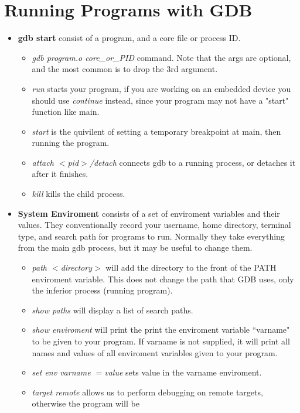 \documentclass{article}
\begin{document}
\section*{Running Programs with GDB}
	\begin{itemize}
		\item \textbf{gdb start} consist of a program, and a core file or process ID. 
			\begin{itemize}
				\item \textit{gdb program.o core\_or\_PID} command. Note that the args are optional, and the 
					most common is to drop the 3rd argument.
				\item \textit{run} starts your program, if you are working on an embedded device you should 
					use \textit{continue} instead, since your program may not have a "start" function like main.
				\item \textit{start} is the quivilent of setting a temporary breakpoint at main, then running the program.
				\item \textit{attach $<$pid$>$/detach} connects gdb to a running process, or detaches it after it finishes.
				\item \textit{kill} kills the child process.
			\end{itemize}
		\item \textbf{System Enviroment} consists of a set of enviroment variables and their values. They 
			conventionally record your username, home directory, terminal type, and search path for programs to 
			run. Normally they take everything from the main gdb process, but it may be useful to change them.
			\begin{itemize}
				\item \textit{path $<$directory$>$} will add the directory to the front of the PATH enviroment variable. 
					This does not change the path that GDB uses, only the inferior process (running program).
				\item \textit{show paths} will display a list of search paths.
				\item \textit{show enviroment} will print the print the enviroment variable ``varname" to be given to 
					your program. If varname is not supplied, it will print all names and values of all enviroment 
					variables given to your program.
				\item \textit{set env varname $=$value} sets value in the varname enviroment.
				\item \textit{target remote} allows us to perform debugging on remote targets, otherwise the program will be

\end{itemize}
\end{itemize}
\end{document}
